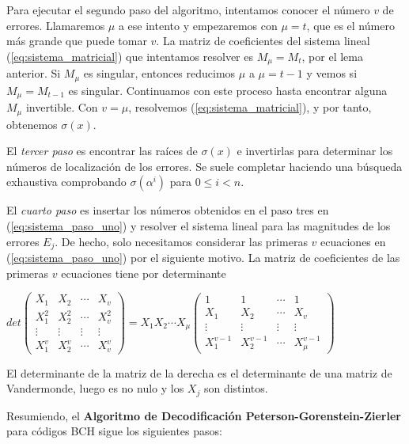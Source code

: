 Para ejecutar el segundo paso del algoritmo, intentamos conocer el número $v$ de errores. Llamaremos $\mu$ a ese intento y empezaremos con $\mu = t$, que es el número más grande que puede tomar $v$. La matriz de coeficientes del sistema lineal (\ref{eq:sistema_matricial}) que intentamos resolver es $M_\mu = M_t$, por el lema anterior. Si $M_\mu$ es singular, entonces reducimos $\mu$ a $\mu = t-1$ y vemos si $M_\mu = M_{t-1}$ es singular. Continuamos con este proceso hasta encontrar alguna $M_\mu$ invertible. Con $v = \mu$, resolvemos (\ref{eq:sistema_matricial}), y por tanto, obtenemos $\sigma(x)$. 

El \textit{tercer paso} es encontrar las raíces de $\sigma(x)$ e invertirlas para determinar los números de localización de los errores. Se suele completar haciendo una búsqueda exhaustiva comprobando $\sigma(\alpha^i)$ para $ 0 \leq i < n$.

El \textit{cuarto paso} es insertar los números obtenidos en el paso tres en (\ref{eq:sistema_paso_uno}) y resolver el sistema lineal para las magnitudes de los errores $E_j$. De hecho, solo necesitamos considerar las primeras $v$ ecuaciones en (\ref{eq:sistema_paso_uno}) por el siguiente motivo. La matriz de coeficientes de las primeras $v$ ecuaciones tiene por determinante 


$det \begin{pmatrix}
			X_1 & X_2  & \cdots &  X_v \\
			X_1^2 & X_2^2  & \cdots & X_v^2 \\
 			\vdots & \vdots & \vdots & \vdots  \\
			X_1^v & X_2^v & \cdots & X_v^v 
	\end{pmatrix} = X_1X_2\cdots X_\mu \begin{pmatrix}
			1 & 1 & \cdots &  1 \\
			X_1 & X_2  & \cdots & X_v \\
 			\vdots & \vdots & \vdots & \vdots  \\
			X_1^{v-1} & X_2^{v-1} & \cdots & X_\mu^{v-1} 
	\end{pmatrix}  $

El determinante de la matriz de la derecha es el determinante de una matriz de Vandermonde, luego es no nulo y los $X_j$ son distintos.


Resumiendo, el \textbf{Algoritmo de Decodificación Peterson-Gorenstein-Zierler} para códigos BCH sigue los siguientes pasos: 

